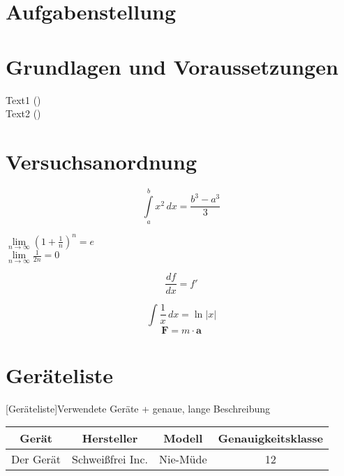 \documentclass[11pt]{scrartcl}
\begin{document}
%

\clearpage
\tableofcontents
\newpage

\section{Aufgabenstellung}
\label{sec:aufgabenstellung}

\section{Grundlagen und Voraussetzungen}
\label{sec:grundlagen_voraussetzungen}

Text1 (\cite[S. 1000]{ref:dem1}) \\
Text2 (\cite[Kapitel 74]{ref:knoll})


\section{Versuchsanordnung}
\label{sec:versuchsanordnung}

\begin{equation}
\label{eq:grenzen-oben-unten}
    \int \limits_{a}^{b} x^2 \, dx =\frac{b^3-a^3}{3}  %
\end{equation}

\(\lim \limits_{n \to \infty} \left( 1 + \frac{1}{n} \right) ^{n} = e\)  \\ %
$\lim \limits_{n \to \infty} \frac{1}{2n} = 0$  %

\begin{displaymath}
    \frac{df}{dx} = f'
\end{displaymath}

\[ \int \frac{1}{x} \, dx = \ln|x| \]  %
$$ \textbf{F} = m \cdot \textbf{a} $$  %

\section{Geräteliste}
\label{sec:geraeteliste}

\begin{center}
[Geräteliste]{Verwendete Geräte + genaue, lange Beschreibung}  %
\label{tab:geraeteliste}
    \begin{tabular}{|c|c|c|c|} \hline
        Gerät & Hersteller & Modell & Genauigkeitsklasse \\ \hline
        Der Gerät & Schweißfrei Inc. & Nie-Müde & 12 \\ \hline
    \end{tabular}
\end{center}
\end{document}
